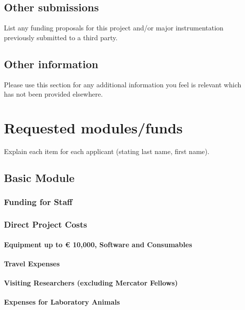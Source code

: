 \documentclass[11pt,a4paper]{article}
\begin{document}
\subsection{Other submissions}
List any funding proposals for this project and/or major instrumentation previously submitted to a third party.


\subsection{Other information}
Please use this section for any additional information you feel is relevant which has not been provided elsewhere.


\section{Requested modules/funds}
Explain each item for each applicant (stating last name, first name).

\subsection{Basic Module}

\subsubsection{Funding for Staff}

\subsubsection{Direct Project Costs}

\paragraph{Equipment up to € 10,000, Software and Consumables}

\paragraph{Travel Expenses}

\paragraph{	Visiting Researchers (excluding Mercator Fellows)}

\paragraph{Expenses for Laboratory Animals}
\end{document}
